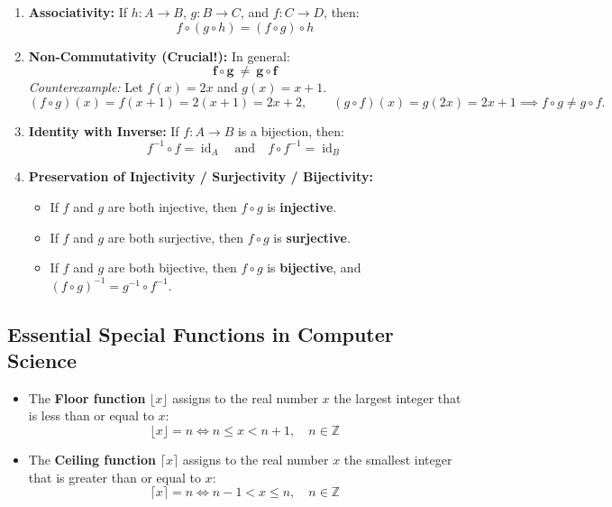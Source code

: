 \documentclass[11pt,a4paper]{article}
\begin{document}
\begin{theorembox}
\begin{enumerate}
    \item \textbf{Associativity:} If $h: A \to B$, $g: B \to C$, and $f: C \to D$, then:
    \[
    f \circ (g \circ h) = (f \circ g) \circ h
    \]
    \item \textbf{Non-Commutativity (Crucial!):} In general:
    \[
    \mathbf{f \circ g \ \neq \ g \circ f}
    \]
    \textit{Counterexample:} Let $f(x) = 2x$ and $g(x) = x + 1$.
    \[
    (f \circ g)(x) = f(x+1) = 2(x+1) = 2x + 2, \qquad (g \circ f)(x) = g(2x) = 2x + 1 \implies f \circ g \neq g \circ f.
    \]
    \item \textbf{Identity with Inverse:} If $f: A \to B$ is a bijection, then:
    \[
    f^{-1} \circ f = \operatorname{id}_A \quad \text{and} \quad f \circ f^{-1} = \operatorname{id}_B
    \]
    \item \textbf{Preservation of Injectivity / Surjectivity / Bijectivity:}
    \begin{itemize}
        \item If $f$ and $g$ are both injective, then $f \circ g$ is \textbf{injective}.
        \item If $f$ and $g$ are both surjective, then $f \circ g$ is \textbf{surjective}.
        \item If $f$ and $g$ are both bijective, then $f \circ g$ is \textbf{bijective}, and $(f \circ g)^{-1} = g^{-1} \circ f^{-1}$.
    \end{itemize}
\end{enumerate}
\end{theorembox}

\subsection{Essential Special Functions in Computer Science}

\begin{defbox}
\begin{itemize}
    \item The \textbf{Floor function} $\lfloor x \rfloor$ assigns to the real number $x$ the largest integer that is less than or equal to $x$:
    \[
    \lfloor x \rfloor = n \iff n \le x < n + 1, \quad n \in \mathbb{Z}
    \]
    \item The \textbf{Ceiling function} $\lceil x \rceil$ assigns to the real number $x$ the smallest integer that is greater than or equal to $x$:
    \[
    \lceil x \rceil = n \iff n - 1 < x \le n, \quad n \in \mathbb{Z}
    \]
\end{itemize}
\end{defbox}
\end{document}
